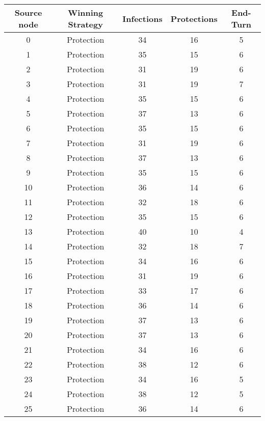 \documentclass[results.tex]{subfiles}
\begin{document}
\begin{center}
  \begin{tabular}{| c || c | c | c | c |}
    \hline
    {\bfseries Source node} & {\bfseries Winning Strategy} & {\bfseries Infections} & {\bfseries Protections} & {\bfseries End-Turn} \\  %
    \hline\hline
    0 & Protection & 34 & 16 & 5 \\ 
    \hline
    1 & Protection & 35 & 15 & 6 \\ 
    \hline
    2 & Protection & 31 & 19 & 6 \\ 
    \hline
    3 & Protection & 31 & 19 & 7 \\ 
    \hline
    4 & Protection & 35 & 15 & 6 \\ 
    \hline
    5 & Protection & 37 & 13 & 6 \\ 
    \hline
    6 & Protection & 35 & 15 & 6 \\ 
    \hline
    7 & Protection & 31 & 19 & 6 \\ 
    \hline
    8 & Protection & 37 & 13 & 6 \\ 
    \hline
    9 & Protection & 35 & 15 & 6 \\ 
    \hline
    10 & Protection & 36 & 14 & 6 \\ 
    \hline
    11 & Protection & 32 & 18 & 6 \\ 
    \hline
    12 & Protection & 35 & 15 & 6 \\ 
    \hline
    13 & Protection & 40 & 10 & 4 \\ 
    \hline
    14 & Protection & 32 & 18 & 7 \\ 
    \hline
    15 & Protection & 34 & 16 & 6 \\ 
    \hline
    16 & Protection & 31 & 19 & 6 \\ 
    \hline
    17 & Protection & 33 & 17 & 6 \\ 
    \hline
    18 & Protection & 36 & 14 & 6 \\ 
    \hline
    19 & Protection & 37 & 13 & 6 \\ 
    \hline
    20 & Protection & 37 & 13 & 6 \\ 
    \hline
    21 & Protection & 34 & 16 & 6 \\ 
    \hline
    22 & Protection & 38 & 12 & 6 \\ 
    \hline
    23 & Protection & 34 & 16 & 5 \\ 
    \hline
    24 & Protection & 38 & 12 & 5 \\ 
    \hline
    25 & Protection & 36 & 14 & 6 \\ 

\end{tabular}
\end{center}
\end{document}
